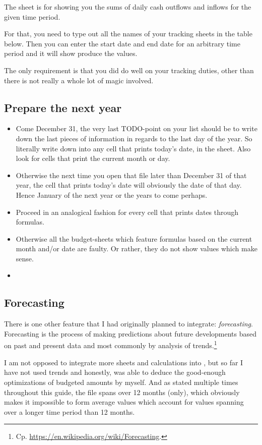 The sheet  is for showing you the sums of daily cash outflows and inflows for the given time period.

For that, you need to type out all the names of your tracking sheets in the table below.
Then you can enter the start date and end date for an arbitrary time period and it will show produce the values.

The only requirement is that you did do well on your tracking duties, other than there is not really a whole lot of magic involved.

\subsection{Prepare the next year}
\label{subsec:prepare-the-next-year}

\begin{itemize}
	\item Come December 31, the very last TODO-point on your list should be to write down the last pieces of information in regards to the last day of the year.
	So literally write down  into any cell that prints today's date, \eg in the  sheet.
	Also look for cells that print the current month or day.
	\item Otherwise the next time you open that file later than December 31 of that year, the cell that prints today's date will obviously the date of that day.
	Hence January of the next year or the years to come perhaps.
	\item Proceed in an analogical fashion for every cell that prints dates through formulas.
	\item Otherwise all the budget-sheets which feature formulas based on the current month and/or date are faulty.
	Or rather, they do not show values which make sense.
	\item 
\end{itemize}

\subsection{Forecasting}
\label{subsec:forecasting}

There is one other feature that I had originally planned to integrate: \emph{forecasting}.
Forecasting is the process of making predictions about future developments based on past and present data and most commonly by analysis of trends.\footnote{Cp. \href{https://en.wikipedia.org/wiki/Forecasting}{https://en.wikipedia.org/wiki/Forecasting}.}

I am not opposed to integrate more sheets and calculations into \tfn, but so far I have not used trends and honestly, was able to deduce the good-enough optimizations of budgeted amounts by myself.
And as stated multiple times throughout this guide, the file spans over 12 months (only), which obviously makes it impossible to form average values which account for values spanning over a longer time period than 12 months.
